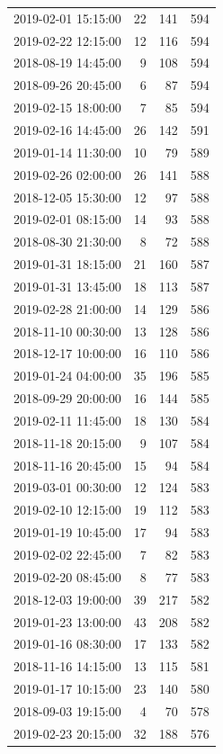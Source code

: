 \begin{tabular}{lrrr}
2019-02-01 15:15:00 & 22 & 141 & 594 \\
2019-02-22 12:15:00 & 12 & 116 & 594 \\
2018-08-19 14:45:00 & 9 & 108 & 594 \\
2018-09-26 20:45:00 & 6 & 87 & 594 \\
2019-02-15 18:00:00 & 7 & 85 & 594 \\
2019-02-16 14:45:00 & 26 & 142 & 591 \\
2019-01-14 11:30:00 & 10 & 79 & 589 \\
2019-02-26 02:00:00 & 26 & 141 & 588 \\
2018-12-05 15:30:00 & 12 & 97 & 588 \\
2019-02-01 08:15:00 & 14 & 93 & 588 \\
2018-08-30 21:30:00 & 8 & 72 & 588 \\
2019-01-31 18:15:00 & 21 & 160 & 587 \\
2019-01-31 13:45:00 & 18 & 113 & 587 \\
2019-02-28 21:00:00 & 14 & 129 & 586 \\
2018-11-10 00:30:00 & 13 & 128 & 586 \\
2018-12-17 10:00:00 & 16 & 110 & 586 \\
2019-01-24 04:00:00 & 35 & 196 & 585 \\
2018-09-29 20:00:00 & 16 & 144 & 585 \\
2019-02-11 11:45:00 & 18 & 130 & 584 \\
2018-11-18 20:15:00 & 9 & 107 & 584 \\
2018-11-16 20:45:00 & 15 & 94 & 584 \\
2019-03-01 00:30:00 & 12 & 124 & 583 \\
2019-02-10 12:15:00 & 19 & 112 & 583 \\
2019-01-19 10:45:00 & 17 & 94 & 583 \\
2019-02-02 22:45:00 & 7 & 82 & 583 \\
2019-02-20 08:45:00 & 8 & 77 & 583 \\
2018-12-03 19:00:00 & 39 & 217 & 582 \\
2019-01-23 13:00:00 & 43 & 208 & 582 \\
2019-01-16 08:30:00 & 17 & 133 & 582 \\
2018-11-16 14:15:00 & 13 & 115 & 581 \\
2019-01-17 10:15:00 & 23 & 140 & 580 \\
2018-09-03 19:15:00 & 4 & 70 & 578 \\
2019-02-23 20:15:00 & 32 & 188 & 576 \\

\end{tabular}

